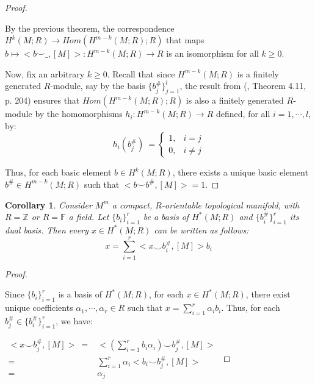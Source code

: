 \documentclass[12pt,oneside]{book}
\newtheorem{cor}    {Corollary}[chapter]
\newcommand{\ds}{\displaystyle}
\newcommand{\Z}{\mathbb{Z}}
\newcommand{\F}{\mathbb{F}}
\newcommand{\ccup}{\smile}
\begin{document}
    \begin{proof}
        
        \
        
        By the previous theorem, the correspondence $H^{k}(M;R)\to Hom(H^{m-k}(M;R);R)$ that maps 
        $b\mapsto <b\ccup \_,[M]>:H^{m-k}(M;R)\to R$ is an isomorphism for all $k\geq 0$.
        
        Now, fix an arbitrary $k\geq 0$. Recall that since $H^{m-k}(M;R)$ is a finitely generated $R$-module, say by the basis 
        $\{b^{\#}_{j}\}_{j=1}^{l}$, the result from (\cite{hungerford}, Theorem 4.11, p. 204) ensures that $Hom(H^{m-k}(M;R);R)$ is also a 
        finitely generated $R$-module by the homomorphisms $h_{i}:H^{m-k}(M;R)\to R$ defined, for all $i=1,\cdots,l$, by:
        $$ h_{i}(b^{\#}_{j}) \ =\left\{ \begin{array}{rl}
            1, & i=j \\
            0, & i\neq j
        \end{array}\right. $$
    
        Thus, for each basic element $b\in H^{k}(M;R)$, there exists a unique basic element $b^{\#}\in H^{m-k}(M;R)$ such that 
        $<b\ccup b^{\#},[M]>=1$.
        
    \end{proof}
    
    \begin{cor}\label{base_dual_3}
        Consider $M^{m}$ a compact, $R$-orientable topological manifold, with $R=\Z$ or $R=\F$ a field. Let $\{b_{i}\}_{i=1}^{r}$ be a basis 
        of $H^{*}(M;R)$ and $\{b^{\#}_{i}\}_{i=1}^{r}$ its dual basis. Then every $x\in H^{*}(M;R)$ can be written as follows:
        $$ x=\ds\sum_{i=1}^{r}<x\ccup b^{\#}_{i},[M]>b_{i} $$
    \end{cor}
    
    \begin{proof}
        
        \
        
        Since $\{b_{i}\}_{i=1}^{r}$ is a basis of $H^{*}(M;R)$, for each $x\in H^{*}(M;R)$, there exist unique coefficients 
        $\alpha_{1},\cdots, \alpha_{r}\in R$ such that $x=\ds\sum_{i=1}^{r}\alpha_{i}b_{i}$. Thus, for each 
        $b^{\#}_{j}\in \{b^{\#}_{i}\}_{i=1}^{r}$, we have:
        
        $ \begin{array}{rl}
            <x\ccup b_{j}^{\#},[M]> \ = & <\left( \ds\sum_{i=1}^{r}b_{i}\alpha_{i} \right) \ccup b_{j}^{\#},[M]> \\
            = & \ds\sum_{i=1}^{r}\alpha_{i}<b_{i}\ccup b^{\#}_{j},[M]> \\
            = & \alpha_{j}
        \end{array} $
        
    \end{proof}
    
\end{document}
